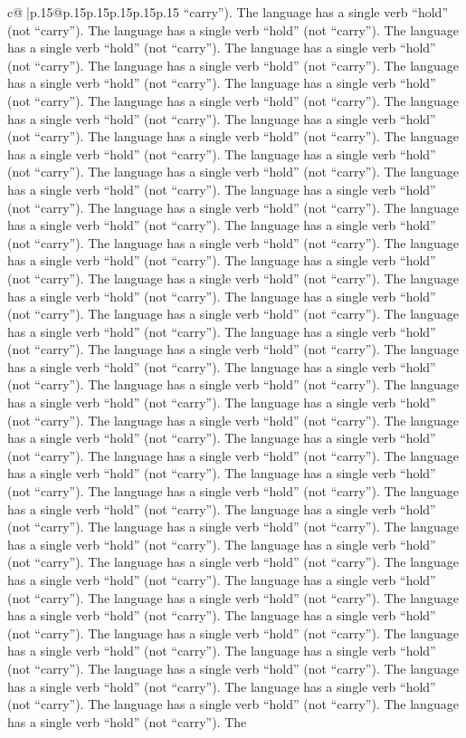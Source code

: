 \documentclass{article}
\begin{document}
{\begin{supertabular}{c@{$\;$}|p{.15\linewidth}@{}p{.15\linewidth}p{.15\linewidth}p{.15\linewidth}p{.15\linewidth}p{.15\linewidth}}
{{{“carry”). The language has a single verb “hold” (not “carry”). The language has a single verb “hold” (not “carry”). The language has a single verb “hold” (not “carry”). The language has a single verb “hold” (not “carry”). The language has a single verb “hold” (not “carry”). The language has a single verb “hold” (not “carry”). The language has a single verb “hold” (not “carry”). The language has a single verb “hold” (not “carry”). The language has a single verb “hold” (not “carry”). The language has a single verb “hold” (not “carry”). The language has a single verb “hold” (not “carry”). The language has a single verb “hold” (not “carry”). The language has a single verb “hold” (not “carry”). The language has a single verb “hold” (not “carry”). The language has a single verb “hold” (not “carry”). The language has a single verb “hold” (not “carry”). The language has a single verb “hold” (not “carry”). The language has a single verb “hold” (not “carry”). The language has a single verb “hold” (not “carry”). The language has a single verb “hold” (not “carry”). The language has a single verb “hold” (not “carry”). The language has a single verb “hold” (not “carry”). The language has a single verb “hold” (not “carry”). The language has a single verb “hold” (not “carry”). The language has a single verb “hold” (not “carry”). The language has a single verb “hold” (not “carry”). The language has a single verb “hold” (not “carry”). The language has a single verb “hold” (not “carry”). The language has a single verb “hold” (not “carry”). The language has a single verb “hold” (not “carry”). The language has a single verb “hold” (not “carry”). The language has a single verb “hold” (not “carry”). The language has a single verb “hold” (not “carry”). The language has a single verb “hold” (not “carry”). The language has a single verb “hold” (not “carry”). The language has a single verb “hold” (not “carry”). The language has a single verb “hold” (not “carry”). The language has a single verb “hold” (not “carry”). The language has a single verb “hold” (not “carry”). The language has a single verb “hold” (not “carry”). The language has a single verb “hold” (not “carry”). The language has a single verb “hold” (not “carry”). The language has a single verb “hold” (not “carry”). The language has a single verb “hold” (not “carry”). The language has a single verb “hold” (not “carry”). The language has a single verb “hold” (not “carry”). The language has a single verb “hold” (not “carry”). The language has a single verb “hold” (not “carry”). The language has a single verb “hold” (not “carry”). The language has a single verb “hold” (not “carry”). The language has a single verb “hold” (not “carry”). The language has a single verb “hold” (not “carry”). The language has a single verb “hold” (not “carry”). The language has a single verb “hold” (not “carry”). The language has a single verb “hold” (not “carry”). The language has a single verb “hold” (not “carry”). The language has a single verb “hold” (not “carry”). The language has a single verb “hold” (not “carry”). The language has a single verb “hold” (not “carry”). The language has a single verb “hold” (not “carry”). The }}}
\end{supertabular}}
\end{document}
